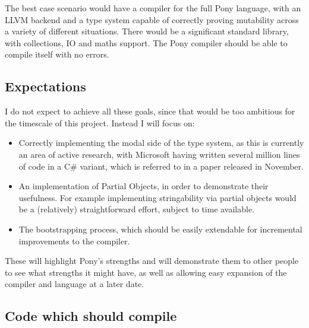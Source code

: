 \documentclass[pdftex,12pt,a4paper]{article}
\begin{document}
The best case scenario would have a compiler for the full Pony language, with an LLVM backend and a type system capable of correctly proving mutability across a variety of different situations.
There would be a significant standard library, with collections, IO and maths support.
The Pony compiler should be able to compile itself with no errors.

\subsection{Expectations}

I do not expect to achieve all these goals, since that would be too ambitious for the timescale of this project.
Instead I will focus on:
\begin{itemize}
\item Correctly implementing the modal side of the type system, as	this is currently an area of active research, with Microsoft having written several million lines of code in a C\# variant, which is referred to in a paper released in November\cite{microsoft2012}.
\item An implementation of Partial Objects, in order to demonstrate their usefulness.
	For example implementing stringability via partial objects would be a (relatively) straightforward effort, subject to time available.
\item The bootstrapping process, which should be easily extendable for incremental improvements to the compiler.
\end{itemize}

These will highlight Pony's strengths and will demonstrate them to other people to see what strengths it might have, as well as allowing easy expansion of the compiler and language at a later date.

\subsection{Code which should compile}
\end{document}
